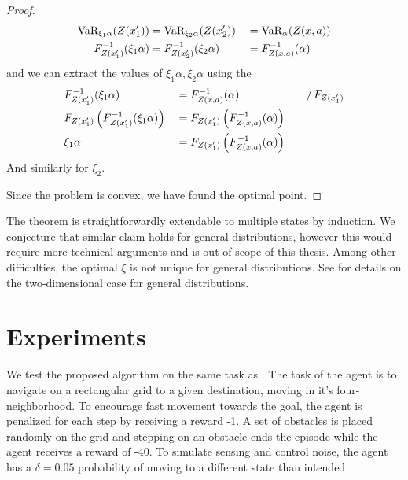 \begin{proof}
\begin{equation*}
\begin{split}
\text{VaR}_{\xi_1\alpha}(Z(x_1')) &= \text{VaR}_{\xi_2\alpha}(Z(x_2')) &&= \text{VaR}_\alpha(Z(x, a))\\
F^{-1}_{Z(x_1')}(\xi_1\alpha) &= F^{-1}_{Z(x_2')}(\xi_2\alpha) &&= F^{-1}_{Z(x, a)}(\alpha)
\end{split}
\end{equation*}
and we can extract the values of $\xi_1\alpha, \xi_2\alpha$ using the 
\begin{equation*}
\begin{split}
&F^{-1}_{Z(x_1')}(\xi_1\alpha) &&= F^{-1}_{Z(x, a)}(\alpha) &&&/ \, F_{Z(x_1')}\\
&F_{Z(x_1')}\left( {F^{-1}_{Z(x_1')}(\xi_1\alpha)} \right) &&= F_{Z(x_1')}\left( {F^{-1}_{Z(x, a)}(\alpha)} \right)\\
&\xi_1\alpha &&= F_{Z(x_1')}\left( {F^{-1}_{Z(x, a)}(\alpha)} \right)
\end{split}
\end{equation*}
And similarly for $\xi_2$.

Since the problem is convex, we have found the optimal point.

\end{proof}

The theorem is straightforwardly extendable to multiple states by induction. We conjecture that similar claim holds for general distributions, however this would require more technical arguments and is out of scope of this thesis. Among other difficulties, the optimal $\xi$ is not unique for general distributions. See \citet{bernard2015quantile} for details on the two-dimensional case for general distributions.




\section{Experiments}\label{sec:vi:experiments}

We test the proposed algorithm on the same task as \citet{chow2015risk}. The task of the agent is to navigate on a rectangular grid to a given destination, moving in it's four-neighborhood. To encourage fast movement towards the goal, the agent is penalized for each step by receiving a reward -1. A set of obstacles is placed randomly on the grid and stepping on an obstacle ends the episode while the agent receives a reward of -40.
To simulate sensing and control noise, the agent has a $\delta=0.05$ probability of moving to a different state than intended.

